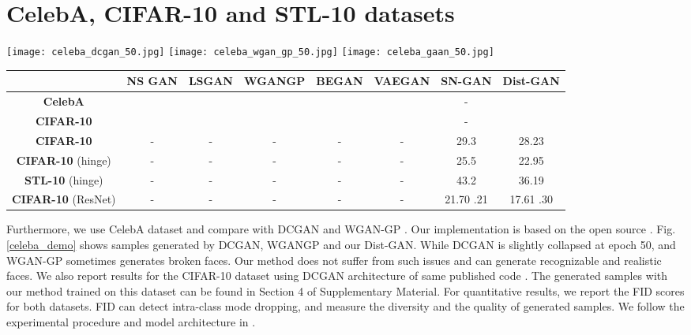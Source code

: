 \documentclass[runningheads]{llncs}
\begin{document}
\section{CelebA, CIFAR-10 and STL-10 datasets}
\begin{figure*}[t]
\centering
\texttt{[image: celeba\_dcgan\_50.jpg]}
\texttt{[image: celeba\_wgan\_gp\_50.jpg]}
\texttt{[image: celeba\_gaan\_50.jpg]}
\caption{Generated samples of DCGAN (50 epochs, results from \cite{gan_source}), WGAN-GP (50 epochs, results from \cite{gan_source}) and our Dist-GAN (50 epochs).}
\label{celeba_demo}
\end{figure*}
\begin{table*}[t]
\centering
\scriptsize
\caption{Comparing FID score to other methods. First two rows (CelebA, CIFAR-10) follow the experimental setup of \cite{lucic-2017-arxiv}, and the second row follow the experimental setup of \cite{miyato-iclr-2018} with standard CNN architectures, and the last row is with ResNet architecture.}
\begin{tabular}{c | c | c | c | c | c | c | c}
           & \textbf{NS GAN} & \textbf{LSGAN} & \textbf{WGANGP} & \textbf{BEGAN} & \textbf{VAEGAN} & \textbf{SN-GAN} & \textbf{Dist-GAN} \\
\hline
\textbf{CelebA}    &   &  &   &  &  & - &   \\
\textbf{CIFAR-10}     &  &  &  &   &  & - &   \\
\hline
\textbf{CIFAR-10}     & - & - & - &  - & - & 29.3 & 28.23 \\
\textbf{CIFAR-10} (hinge) & - & - & - & - & - & 25.5 & 22.95 \\
\textbf{STL-10} (hinge) & - & - & - & - & - & 43.2 & 36.19\\
\hline
\textbf{CIFAR-10} (ResNet) & - & - & - & - & - & 21.70  .21 & 17.61  .30 \\
\end{tabular}
\label{fid_score}
\end{table*}
Furthermore, we use CelebA dataset and compare with DCGAN \cite{radford-arxiv-2015} and WGAN-GP \cite{gulrajani-arxiv-2017}. Our implementation is based on the open source \cite{gan_source_b,gan_source}.
Fig. \ref{celeba_demo} shows samples generated by DCGAN, WGANGP and our Dist-GAN. While DCGAN is slightly collapsed at epoch 50, and WGAN-GP sometimes generates broken faces.
Our method does not suffer from such issues and can generate recognizable and realistic faces.
We also report  results for the CIFAR-10 dataset using DCGAN architecture \cite{radford-arxiv-2015} of same published code \cite{gulrajani-arxiv-2017}. The generated samples with our method trained on this dataset can be found in Section 4 of Supplementary Material. For quantitative results, we report the FID scores \cite{heusel-arxiv-2017} for both datasets. FID can detect intra-class mode dropping, and measure the diversity and the quality of generated samples. We follow the experimental procedure and model architecture in \cite{lucic-2017-arxiv}.
\end{document}
